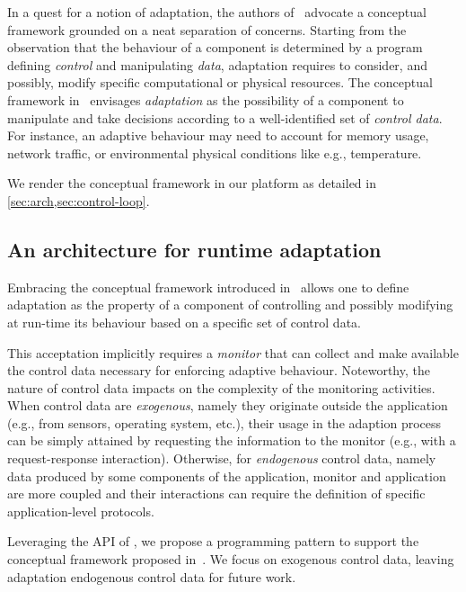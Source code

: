 
In a quest for a notion of adaptation, the authors of~\cite{bcglv12}
advocate a conceptual framework grounded on a neat separation of
concerns.
%
Starting from the observation that the behaviour of a component is
determined by a program defining \emph{control} and manipulating
\emph{data}, adaptation requires to consider, and possibly, modify
specific computational or physical resources.
%
The conceptual framework in~\cite{bcglv12} envisages \emph{adaptation}
as the possibility of a component to manipulate and take decisions
according to a well-identified set of \emph{control data}.
%
For instance, an adaptive behaviour may need to account for memory
usage, network traffic, or environmental physical conditions like
e.g., temperature.

We render the conceptual framework in our platform as detailed in
\cref{sec:arch,sec:control-loop}.

\subsection{An architecture for runtime adaptation}\label{sec:arch}
%
Embracing the conceptual framework introduced in~\cite{bcglv12} allows
one to define adaptation as the property of a component of controlling
and possibly modifying at run-time its behaviour based on a specific
set of control data.

This acceptation implicitly requires a \emph{monitor} that can collect
and make available the control data necessary for enforcing adaptive
behaviour.
%
Noteworthy, the nature of control data impacts on the complexity of
the monitoring activities.
%
When control data are \emph{exogenous}, namely they originate outside
the application (e.g., from sensors, operating system, etc.), their
usage in the adaption process can be simply attained by requesting the
information to the monitor (e.g., with a request-response
interaction).
%
Otherwise, for \emph{endogenous} control data, namely data produced by
some components of the application, monitor and application are more
coupled and their interactions can require the definition of specific
application-level protocols.

Leveraging the API of \SEArch, we propose a programming pattern to
support the conceptual framework proposed
in~\cite{bcglv12}.
%
We focus on exogenous control data, leaving adaptation endogenous
control data for future work.
%

